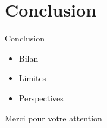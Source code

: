 \documentclass[11pt]{beamer}
\begin{document}
\section{Conclusion}

\begin{frame}{Conclusion}
\begin{itemize}
  \item Bilan
  \item Limites
  \item Perspectives
\end{itemize}
\end{frame}

\begin{frame}
\centering
\Large Merci pour votre attention
\end{frame}
\end{document}
